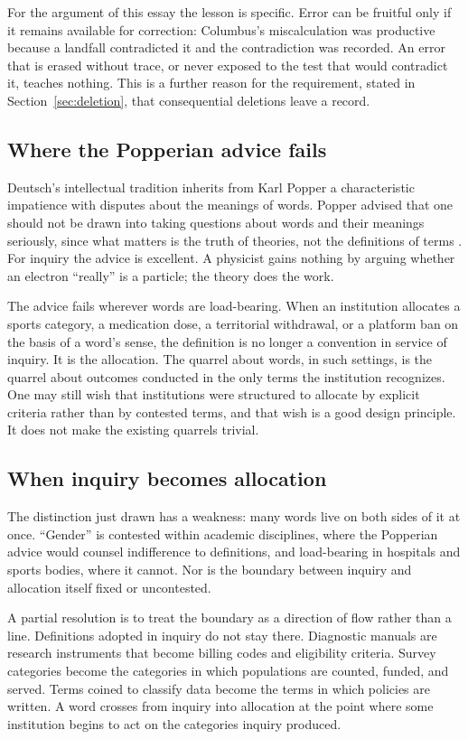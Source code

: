\documentclass[11pt,a4paper]{article}
\theoremstyle{plain}
\theoremstyle{definition}
\theoremstyle{remark}
\begin{document}
For the argument of this essay the lesson is specific. Error can be fruitful only if it remains available for correction: Columbus's miscalculation was productive because a landfall contradicted it and the contradiction was recorded. An error that is erased without trace, or never exposed to the test that would contradict it, teaches nothing. This is a further reason for the requirement, stated in Section~\ref{sec:deletion}, that consequential deletions leave a record.

\subsection{Where the Popperian advice fails}

Deutsch's intellectual tradition inherits from Karl Popper a characteristic impatience with disputes about the meanings of words. Popper advised that one should not be drawn into taking questions about words and their meanings seriously, since what matters is the truth of theories, not the definitions of terms \cite{popper1976}. For inquiry the advice is excellent. A physicist gains nothing by arguing whether an electron ``really'' is a particle; the theory does the work.

The advice fails wherever words are load-bearing. When an institution allocates a sports category, a medication dose, a territorial withdrawal, or a platform ban on the basis of a word's sense, the definition is no longer a convention in service of inquiry. It is the allocation. The quarrel about words, in such settings, is the quarrel about outcomes conducted in the only terms the institution recognizes. One may still wish that institutions were structured to allocate by explicit criteria rather than by contested terms, and that wish is a good design principle. It does not make the existing quarrels trivial.

\subsection{When inquiry becomes allocation}

The distinction just drawn has a weakness: many words live on both sides of it at once. ``Gender'' is contested within academic disciplines, where the Popperian advice would counsel indifference to definitions, and load-bearing in hospitals and sports bodies, where it cannot. Nor is the boundary between inquiry and allocation itself fixed or uncontested.

A partial resolution is to treat the boundary as a direction of flow rather than a line. Definitions adopted in inquiry do not stay there. Diagnostic manuals are research instruments that become billing codes and eligibility criteria. Survey categories become the categories in which populations are counted, funded, and served. Terms coined to classify data become the terms in which policies are written. A word crosses from inquiry into allocation at the point where some institution begins to act on the categories inquiry produced.
\end{document}
